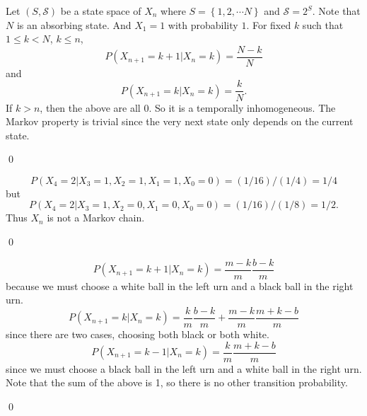 \begin{problem}[5.1.1] \hfill

	Let $(S, \mathcal{S})$ be a state space of $X_n$ where $S = \left\{ 1, 2, \cdots N \right\}$ and $\mathcal{S} = 2^S$.
	Note that $N$ is an absorbing state.
	And $X_1 = 1$ with probability $1$.
	For fixed $k$ such that $1 \leq k < N$, $k \leq n$,
	\[
		P(X_{n+1} = k+1 \lvert X_n = k) = \frac{N-k}{N}
	\]
	and
	\[
		P(X_{n+1} = k \lvert X_n = k) = \frac{k}{N}.
	\]
	If $k > n$, then the above are all $0$.
	So it is a temporally inhomogeneous.
	The Markov property is trivial since the very next state only depends on the current state.

	\qed

\end{problem}

\begin{problem}[5.1.2] \hfill

	\[
		P(X_4 = 2 \lvert X_3 = 1, X_2 = 1, X_1 = 1, X_0 = 0) = (1/16)/(1/4) = 1/4
	\]
	but
	\[
		P(X_4 = 2 \lvert X_3 = 1, X_2 = 0, X_1 = 0, X_0 = 0) = (1/16)/(1/8) = 1/2.
	\]
	Thus $X_n$ is not a Markov chain.

	\qed
\end{problem}

\begin{problem}[5.1.5] \hfill

	\[
		P(X_{n+1} = k+1 \lvert X_n = k) = \frac{m-k}{m}\frac{b-k}{m}
	\]
	because we must choose a white ball in the left urn and a black ball in the right urn.
	\[
		P(X_{n+1} = k \lvert X_n = k) = \frac{k}{m}\frac{b-k}{m} + \frac{m-k}{m}\frac{m+k-b}{m}
	\]
	since there are two cases, choosing both black or both white.
	\[
		P(X_{n+1} = k-1 \lvert X_n = k) = \frac{k}{m}\frac{m+k-b}{m}
	\]
	since we must choose a black ball in the left urn and a white ball in the right urn.
	Note that the sum of the above is 1, so there is no other transition probability.

	\qed
	
\end{problem}

